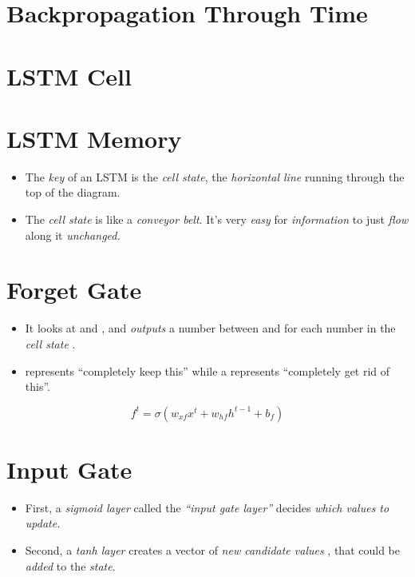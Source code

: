 \documentclass[
	number={10},
	title={Recurrent Neural Networks}
]{cs584notes}
\begin{document}
\section{Backpropagation Through Time}\label{sec:backpropagation-through-time}

\section{LSTM Cell}\label{sec:lstm-cell}

\section{LSTM Memory}\label{sec:lstm-memory}
\begin{itemize}
	\item The \emph{key} of an LSTM is the \emph{cell state}, the \emph{horizontal line} running through the top of the diagram.
	\item The \emph{cell state} is like a \emph{conveyor belt}.
	It's very \emph{easy} for \emph{information} to just \emph{flow} along it \emph{unchanged.}
\end{itemize}

\section{Forget Gate}\label{sec:forget-gate}
\begin{itemize}
	\item It looks at  and , and \emph{outputs} a number between  and  for each number in the \emph{cell state} .
	\item {} represents ``completely keep this'' while a  represents ``completely get rid of this''.
\end{itemize}
\begin{equation}
	f^{t} = \sigma\left( w_{xf}x^{t} + w_{hf}h^{t-1} + b_{f} \right)
	\label{eq:forget-gate}
\end{equation}

\section{Input Gate}\label{sec:input-gate}
\begin{itemize}
	\item First, a \emph{sigmoid layer} called the \emph{``input gate layer''} decides \emph{which values to update.}
	\item Second, a \emph{tanh layer} creates a vector of \emph{new candidate values} , that could be \emph{added} to the \emph{state}.
\end{itemize}
\end{document}
